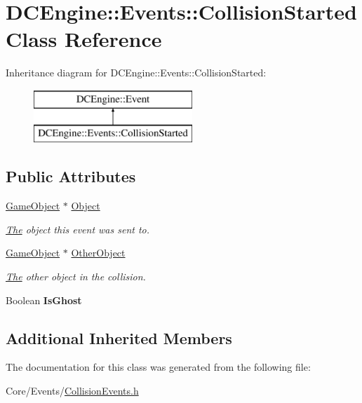 \hypertarget{classDCEngine_1_1Events_1_1CollisionStarted}{\section{D\-C\-Engine\-:\-:Events\-:\-:Collision\-Started Class Reference}
\label{classDCEngine_1_1Events_1_1CollisionStarted}
}
Inheritance diagram for D\-C\-Engine\-:\-:Events\-:\-:Collision\-Started\-:\begin{figure}[H]
\begin{center}
\leavevmode
\includegraphics[height=2.000000cm]{classDCEngine_1_1Events_1_1CollisionStarted}
\end{center}
\end{figure}
\subsection*{Public Attributes}
\begin{DoxyCompactItemize}
\item 
\hypertarget{classDCEngine_1_1Events_1_1CollisionStarted_ae4c537e885960248e5b4dd7ad4fee960}{\hyperlink{classDCEngine_1_1GameObject}{Game\-Object} $\ast$ \hyperlink{classDCEngine_1_1Events_1_1CollisionStarted_ae4c537e885960248e5b4dd7ad4fee960}{Object}}\label{classDCEngine_1_1Events_1_1CollisionStarted_ae4c537e885960248e5b4dd7ad4fee960}

\begin{DoxyCompactList}\small\item\em \hyperlink{classThe}{The} object this event was sent to. \end{DoxyCompactList}\item 
\hypertarget{classDCEngine_1_1Events_1_1CollisionStarted_a39289bb67767390f168e894b9574cd1f}{\hyperlink{classDCEngine_1_1GameObject}{Game\-Object} $\ast$ \hyperlink{classDCEngine_1_1Events_1_1CollisionStarted_a39289bb67767390f168e894b9574cd1f}{Other\-Object}}\label{classDCEngine_1_1Events_1_1CollisionStarted_a39289bb67767390f168e894b9574cd1f}

\begin{DoxyCompactList}\small\item\em \hyperlink{classThe}{The} other object in the collision. \end{DoxyCompactList}\item 
\hypertarget{classDCEngine_1_1Events_1_1CollisionStarted_a7dcfe692c8ed8ef4237973973e617843}{Boolean {\bfseries Is\-Ghost}}\label{classDCEngine_1_1Events_1_1CollisionStarted_a7dcfe692c8ed8ef4237973973e617843}

\end{DoxyCompactItemize}
\subsection*{Additional Inherited Members}


The documentation for this class was generated from the following file\-:\begin{DoxyCompactItemize}
\item 
Core/\-Events/\hyperlink{CollisionEvents_8h}{Collision\-Events.\-h}\end{DoxyCompactItemize}
